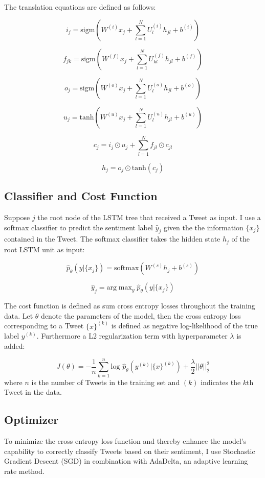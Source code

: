 \documentclass[a4paper,12pt]{article}%
\begin{document}
The translation equations are defined as follows:


$$
i_j = \text{sigm} \left( W^{(i)} x_j + \sum_{l=1}^N U_l^{(i)} h_{jl} + b^{(i)} \right) 
$$

$$
f_{jk} = \text{sigm} \left( W^{(f)} x_j + \sum_{l=1}^N U_{kl}^{(f)} h_{jl} + b^{(f)} \right) 
$$

$$
o_j = \text{sigm} \left( W^{(o)} x_j + \sum_{l=1}^N U_{l}^{(o)} h_{jl} + b^{(o)} \right) 
$$

$$
u_j = \text{tanh} \left( W^{(u)} x_j +\sum_{l=1}^N U_{l}^{(u)} h_{jl} + b^{(u)} \right)
$$

$$
c_j = i_j \odot u_j + \sum_{l=1}^N f_{jl} \odot c_{jl}
$$

$$
h_j = o_j \odot \text{tanh}(c_j)
$$

\subsection{Classifier and Cost Function}
Suppose $j$ the root node of the LSTM tree that received a Tweet as input. I use a softmax classifier to predict the sentiment label $\hat{y}_j$ given the the information $\{x_j\}$ contained in the Tweet. The softmax classifier takes the hidden state $h_j$ of the root LSTM unit as input:

$$
\hat{p}_{\theta} \left(y | \{x_j\} \right) = \text{softmax} \left( W^{(s)} h_j + b^{(s)} \right)
$$

$$
\hat{y}_j = \text{arg} \mathop{\text{max}}_{y} \hat{p}_{\theta} \left(y | \{x_j\} \right)
$$


The cost function is defined as sum cross entropy losses throughout the training data. Let $\theta$ denote the parameters of the model, then the cross entropy loss corresponding to a Tweet $\{x\}^{(k)}$ is defined as negative log-likelihood of the true label $y^{(k)}$. Furthermore a L2 regularization term with hyperparameter $\lambda$ is added:

$$
J(\theta) = - \frac{1}{n} \sum_{k=1}^n \text{log } \hat{p}_{\theta} \left(y^{(k)} | \{x\}^{(k)} \right) + \frac{\lambda}{2} \vert \vert \theta \vert \vert^2_2
$$
where $n$ is the number of Tweets in the training set and $(k)$ indicates the $k$th Tweet in the data.


\subsection{Optimizer}
To minimize the cross entropy loss function and thereby enhance the model's capability to correctly classify Tweets based on their sentiment, I use Stochastic Gradient Descent (SGD) in combination with AdaDelta, an adaptive learning rate method.
\end{document}

